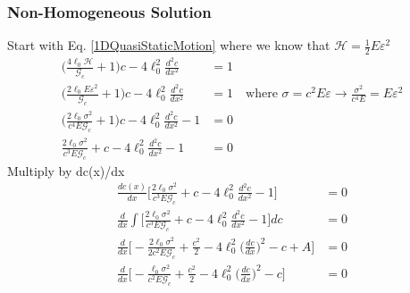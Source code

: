 \documentclass[12pt,3p]{article}
\numberwithin{equation}{section}
\begin{document}
\subsubsection{Non-Homogeneous Solution}
Start with Eq. \ref{1DQuasiStaticMotion} where we know that $\mathcal{H} = \frac{1}{2} E \varepsilon^2$
\begin{align*}
\bigg(\frac{4 \ell_0 \mathcal{H}}{\mathcal{G}_c} + 1 \bigg) c - 4 \ell_0^2 \frac{d^2 c }{d x^2} &= 1 \\
\bigg(\frac{2 \ell_0 E \varepsilon^2}{\mathcal{G}_c} + 1 \bigg) c - 4 \ell_0^2 \frac{d^2 c }{d x^2} &= 1 \quad \text{where } \sigma = c^2 E \varepsilon \rightarrow \frac{\sigma^2}{c^4 E} = E \varepsilon^2 \\
\bigg(\frac{2 \ell_0 \sigma^2}{c^4 E \mathcal{G}_c} + 1 \bigg) c - 4 \ell_0^2 \frac{d^2 c }{d x^2} -1 &= 0 \\
\frac{2 \ell_0 \sigma^2}{c^3 E \mathcal{G}_c} + c - 4 \ell_0^2 \frac{d^2 c }{d x^2} -1 &= 0
\end{align*}
Multiply by dc(x)/dx 
\begin{align*}
\frac{dc(x)}{dx} \bigg[ \frac{2 \ell_0 \sigma^2}{c^3 E \mathcal{G}_c} + c - 4 \ell_0^2 \frac{d^2 c }{d x^2} -1 \bigg] &= 0 \\
\frac{d}{dx} \int \bigg[ \frac{2 \ell_0 \sigma^2}{c^3 E \mathcal{G}_c} + c - 4 \ell_0^2 \frac{d^2 c }{d x^2} -1 \bigg] dc &= 0 \\
\frac{d}{dx} \bigg[ - \frac{2 \ell_0 \sigma^2}{2 c^2 E \mathcal{G}_c} + \frac{c^2}{2} - 4 \ell_0^2 \bigg( \frac{dc }{d x} \bigg)^2 - c + A \bigg] &= 0 \\
\frac{d}{dx} \bigg[ - \frac{\ell_0 \sigma^2}{c^2 E \mathcal{G}_c} + \frac{c^2}{2} - 4 \ell_0^2 \bigg( \frac{dc }{d x} \bigg)^2 -  c \bigg] &= 0
\end{align*}

\end{document}
